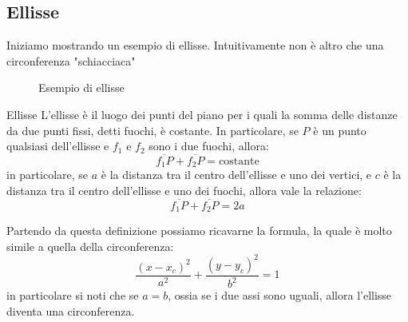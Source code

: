 \subsection{Ellisse}
Iniziamo mostrando un esempio di ellisse. Intuitivamente non è altro che una circonferenza "schiacciaca"
\begin{figure}[H]
	\caption{Esempio di ellisse}
	\label{fig:ellisse}
\end{figure}

\begin{definizione}{Ellisse}
	L'ellisse è il luogo dei punti del piano per i quali la somma delle distanze da due punti fissi, detti fuochi, è costante. In particolare, se $ P $ è un punto qualsiasi dell'ellisse e $ f_1 $ e $ f_2 $ sono i due fuochi, allora:
	\[
		\overline{f_1P}+\overline{f_2P} = \text{costante}
	\]
	in particolare, se $ a $ è la distanza tra il centro dell'ellisse e uno dei vertici, e $ c $ è la distanza tra il centro dell'ellisse e uno dei fuochi, allora vale la relazione:
	\[
		\overline{f_1P}+\overline{f_2P} = 2a
	\]
\end{definizione}
Partendo da questa definizione possiamo ricavarne la formula, la quale è molto simile a quella della circonferenza:
\[
	\frac{\left(x - x_c\right)^2 }{a^2} + \frac{\left(y - y_c\right)^2 }{b^2} = 1
\]
in particolare si noti che se $ a = b $, ossia se i due assi sono uguali, allora l'ellisse diventa una circonferenza.

